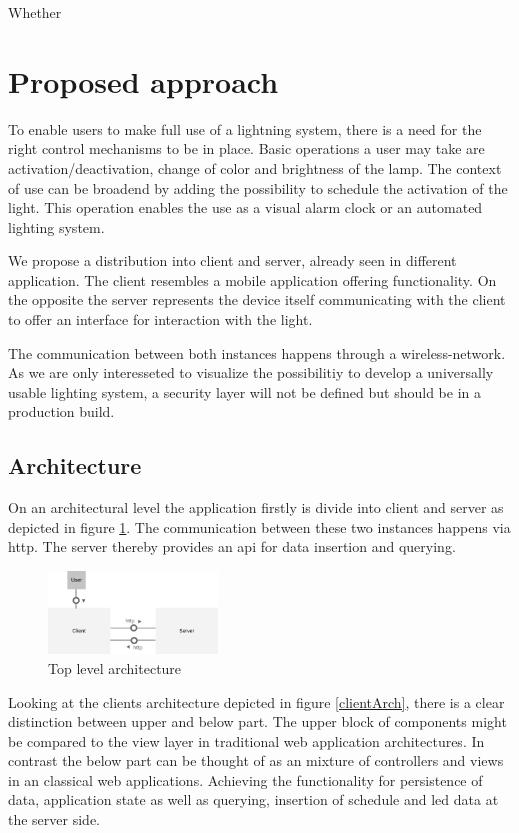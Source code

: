 \documentclass[conference]{IEEEtran}
\begin{document}
Whether 

\section{Proposed approach}
To enable users to make full use of a lightning system, there is a need for the right control mechanisms to be in place.
Basic operations a user may take are activation/deactivation, change of color and brightness of the lamp. The context of use can
be broadend by adding the possibility to schedule the activation of the light. This operation enables the use as a visual alarm
clock or an automated lighting system. 

We propose a distribution into client and server, already seen in different application. The client resembles a mobile application
offering functionality. On the opposite the server represents the device itself communicating with the client to offer an interface for
interaction with the light.

The communication between both instances happens through a wireless-network. As we are only interesseted to visualize the possibilitiy 
to develop a universally usable lighting system, a security layer will not be defined but should be in a production build. 


\subsection{Architecture}
On an architectural level the application firstly is divide into client and server as depicted in figure \ref{topLevelArch}.
The communication between these two instances happens via http. The server thereby provides an api for data insertion and
querying.

\begin{figure}[H]
    \centering
    \includegraphics[width=0.4\textwidth]{top_level_architecture}
    \caption{Top level architecture}
    \label{topLevelArch}
\end{figure}

Looking at the clients architecture depicted in figure \ref{clientArch}, there is a clear distinction between upper and below
part. The upper block of components might be compared to the view layer in traditional web application architectures. In contrast
the below part can be thought of as an mixture of controllers and views in an classical web applications. Achieving the functionality
for persistence of data, application state as well as querying, insertion of schedule and led data at the server side.
\end{document}
